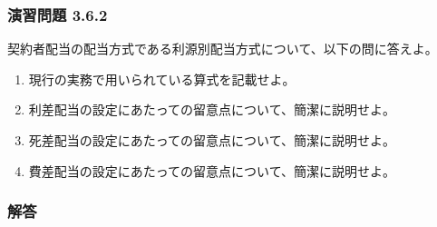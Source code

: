 \documentclass[report,gutter=10mm,fore-edge=10mm,uplatex,dvipdfmx]{jlreq}
\begin{document}
\subsubsection{演習問題 3.6.2}
契約者配当の配当方式である利源別配当方式について、以下の問に答えよ。

\begin{enumerate} [(1)]
\item 現行の実務で用いられている算式を記載せよ。
\item 利差配当の設定にあたっての留意点について、簡潔に説明せよ。
\item 死差配当の設定にあたっての留意点について、簡潔に説明せよ。
\item 費差配当の設定にあたっての留意点について、簡潔に説明せよ。
\end{enumerate}
\subsubsection{解答}
\end{document}
